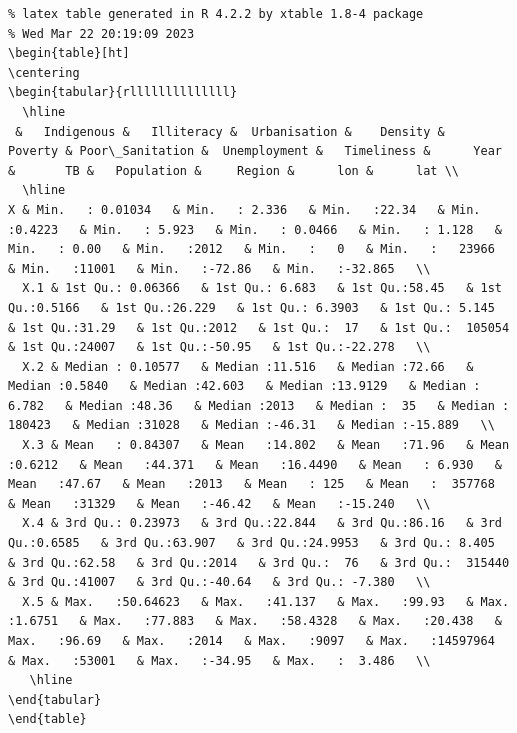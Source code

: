 \documentclass[
  letterpaper,
  DIV=11,
  numbers=noendperiod]{scrartcl}
\begin{document}
\begin{verbatim}
% latex table generated in R 4.2.2 by xtable 1.8-4 package
% Wed Mar 22 20:19:09 2023
\begin{table}[ht]
\centering
\begin{tabular}{rllllllllllllll}
  \hline
 &   Indigenous &   Illiteracy &  Urbanisation &    Density &    Poverty & Poor\_Sanitation &  Unemployment &   Timeliness &      Year &       TB &   Population &     Region &      lon &      lat \\ 
  \hline
X & Min.   : 0.01034   & Min.   : 2.336   & Min.   :22.34   & Min.   :0.4223   & Min.   : 5.923   & Min.   : 0.0466   & Min.   : 1.128   & Min.   : 0.00   & Min.   :2012   & Min.   :   0   & Min.   :   23966   & Min.   :11001   & Min.   :-72.86   & Min.   :-32.865   \\ 
  X.1 & 1st Qu.: 0.06366   & 1st Qu.: 6.683   & 1st Qu.:58.45   & 1st Qu.:0.5166   & 1st Qu.:26.229   & 1st Qu.: 6.3903   & 1st Qu.: 5.145   & 1st Qu.:31.29   & 1st Qu.:2012   & 1st Qu.:  17   & 1st Qu.:  105054   & 1st Qu.:24007   & 1st Qu.:-50.95   & 1st Qu.:-22.278   \\ 
  X.2 & Median : 0.10577   & Median :11.516   & Median :72.66   & Median :0.5840   & Median :42.603   & Median :13.9129   & Median : 6.782   & Median :48.36   & Median :2013   & Median :  35   & Median :  180423   & Median :31028   & Median :-46.31   & Median :-15.889   \\ 
  X.3 & Mean   : 0.84307   & Mean   :14.802   & Mean   :71.96   & Mean   :0.6212   & Mean   :44.371   & Mean   :16.4490   & Mean   : 6.930   & Mean   :47.67   & Mean   :2013   & Mean   : 125   & Mean   :  357768   & Mean   :31329   & Mean   :-46.42   & Mean   :-15.240   \\ 
  X.4 & 3rd Qu.: 0.23973   & 3rd Qu.:22.844   & 3rd Qu.:86.16   & 3rd Qu.:0.6585   & 3rd Qu.:63.907   & 3rd Qu.:24.9953   & 3rd Qu.: 8.405   & 3rd Qu.:62.58   & 3rd Qu.:2014   & 3rd Qu.:  76   & 3rd Qu.:  315440   & 3rd Qu.:41007   & 3rd Qu.:-40.64   & 3rd Qu.: -7.380   \\ 
  X.5 & Max.   :50.64623   & Max.   :41.137   & Max.   :99.93   & Max.   :1.6751   & Max.   :77.883   & Max.   :58.4328   & Max.   :20.438   & Max.   :96.69   & Max.   :2014   & Max.   :9097   & Max.   :14597964   & Max.   :53001   & Max.   :-34.95   & Max.   :  3.486   \\ 
   \hline
\end{tabular}
\end{table}
\end{verbatim}
\end{document}

